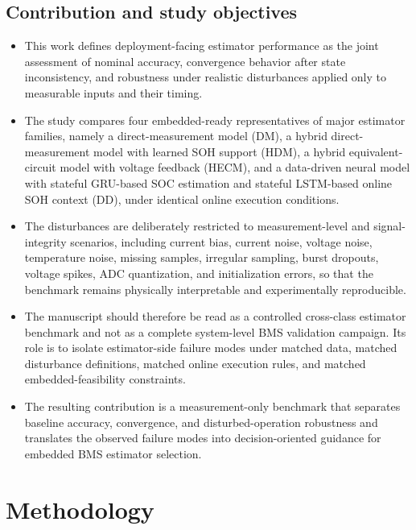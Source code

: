 \documentclass[review,nopreprintline]{elsarticle}
\begin{document}
\subsection{Contribution and study objectives}
\begin{itemize}[leftmargin=*]
    \item This work defines deployment-facing estimator performance as the joint assessment of nominal accuracy, convergence behavior after state inconsistency, and robustness under realistic disturbances applied only to measurable inputs and their timing.
    \item The study compares four embedded-ready representatives of major estimator families, namely a direct-measurement model (DM), a hybrid direct-measurement model with learned SOH support (HDM), a hybrid equivalent-circuit model with voltage feedback (HECM), and a data-driven neural model with stateful GRU-based SOC estimation and stateful LSTM-based online SOH context (DD), under identical online execution conditions.
    \item The disturbances are deliberately restricted to measurement-level and signal-integrity scenarios, including current bias, current noise, voltage noise, temperature noise, missing samples, irregular sampling, burst dropouts, voltage spikes, ADC quantization, and initialization errors, so that the benchmark remains physically interpretable and experimentally reproducible.
    \item The manuscript should therefore be read as a controlled cross-class estimator benchmark and not as a complete system-level BMS validation campaign. Its role is to isolate estimator-side failure modes under matched data, matched disturbance definitions, matched online execution rules, and matched embedded-feasibility constraints.
    \item The resulting contribution is a measurement-only benchmark that separates baseline accuracy, convergence, and disturbed-operation robustness and translates the observed failure modes into decision-oriented guidance for embedded BMS estimator selection.
\end{itemize}

\section{Methodology}
\end{document}
